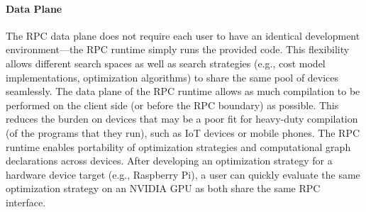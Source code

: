 \paragraph{Data Plane}
The RPC data plane does not require each user to have an identical development environment---the RPC runtime simply runs the provided code.
This flexibility allows different search spaces as well as search strategies (e.g., cost model implementations, optimization algorithms) to share the same pool of devices seamlessly.
The data plane of the RPC runtime allows as much compilation to be performed on the client side (or before the RPC boundary) as possible.
This reduces the burden on devices that may be a poor fit for heavy-duty compilation (of the programs that they run), such as IoT devices or mobile phones.
The RPC runtime enables portability of optimization strategies and computational graph declarations across devices.
After developing an optimization strategy for a hardware device target (e.g., Raspberry Pi), a user can quickly evaluate the same optimization strategy on an NVIDIA GPU as both share the same RPC interface.



